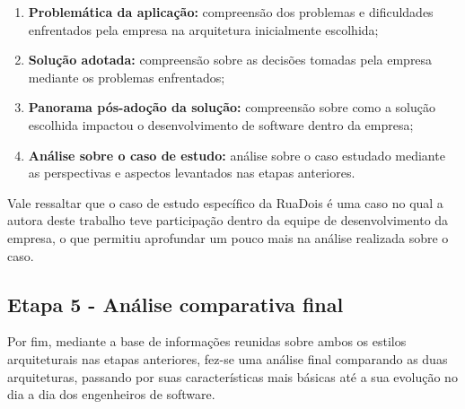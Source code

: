 \begin{enumerate}
    \item \textbf{Problemática da aplicação:} compreensão dos problemas e dificuldades enfrentados
        pela empresa na arquitetura inicialmente escolhida;
    \item \textbf{Solução adotada:} compreensão sobre as decisões tomadas pela empresa mediante os
        problemas enfrentados;
    \item \textbf{Panorama pós-adoção da solução:} compreensão sobre como a solução escolhida
        impactou o desenvolvimento de software dentro da empresa;
    \item \textbf{Análise sobre o caso de estudo:} análise sobre o caso estudado mediante as
        perspectivas e aspectos levantados nas etapas anteriores.
\end{enumerate}

Vale ressaltar que o caso de estudo específico da RuaDois é uma caso no qual a autora deste trabalho
teve participação dentro da equipe de desenvolvimento da empresa, o que permitiu aprofundar um pouco
mais na análise realizada sobre o caso.

\subsection{Etapa 5 - Análise comparativa final}

Por fim, mediante a base de informações reunidas sobre ambos os estilos arquiteturais nas etapas
anteriores, fez-se uma análise final comparando as duas arquiteturas, passando por suas
características mais básicas até a sua evolução no dia a dia dos engenheiros de software.
